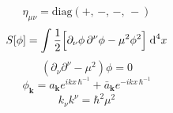 \begin{equation}
	\eta_{\mu\nu}=\text{diag}\left(+,\,-,\,-,\,-\right)
\end{equation}
\begin{equation}\label{eq: Minkowski scalar action}
	S[\phi]=\int\frac{1}{2}\Big[\partial_\nu\phi\,\partial^\nu\phi-\mu^2\phi^2\Big]\;\text{d}^4 x
\end{equation}
\begin{equation}
	\left(\partial_\nu\partial^\nu-\mu^2\right)\phi=0
\end{equation}
\begin{equation}
	\phi_\mathbf{k}=a_\mathbf{k}e^{ikx\,\hbar^{-1}}+\bar a_\mathbf{k}e^{-ikx\,\hbar^{-1}}
\end{equation}
\begin{equation}
	k_\nu k^\nu=\hbar^2\mu^2
\end{equation}